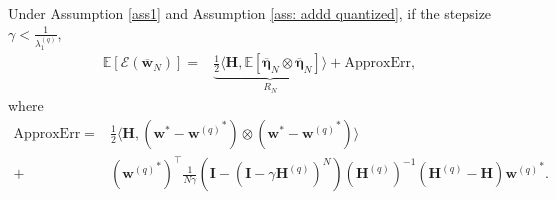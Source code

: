 \documentclass[11pt, letterpaper]{article}
\begin{document}
\begin{lemma}
    \label{Refine excess risk decomposition}
    Under Assumption \ref{ass1} and Assumption \ref{ass: addd quantized}, if the stepsize $\gamma<\frac{1}{{\lambda}_1^{(q)}}$,
    \begin{equation*}
        \begin{aligned}
            \mathbb{E}[\mathcal{E}(\overline{\mathbf{w}}_N)]=&\underbrace{\frac{1}{2}\langle\mathbf{H},\mathbb{E}[\overline{\boldsymbol{\eta}}_N\otimes\overline{\boldsymbol{\eta}}_N]\rangle}_{R_N}+\mathrm{ApproxErr},
        \end{aligned}
    \end{equation*}
    where
    \begin{equation*}
        \begin{aligned}
            \mathrm{ApproxErr}=&\frac{1}{2}\langle\mathbf{H},({\mathbf{w}}^*-{\mathbf{w}^{(q)}}^*)\otimes({\mathbf{w}}^*-{\mathbf{w}^{(q)}}^*)\rangle\\
            +&\left({\mathbf{w}^{(q)}}^*\right)^\top\frac{1}{N\gamma}\left(\mathbf{I}-(\mathbf{I}-\gamma\mathbf{H}^{(q)})^N\right)(\mathbf{H}^{(q)})^{-1}\left(\mathbf{H}^{(q)}-\mathbf{H}\right){\mathbf{w}^{(q)}}^*.
        \end{aligned}
    \end{equation*}
\end{lemma}
\end{document}
